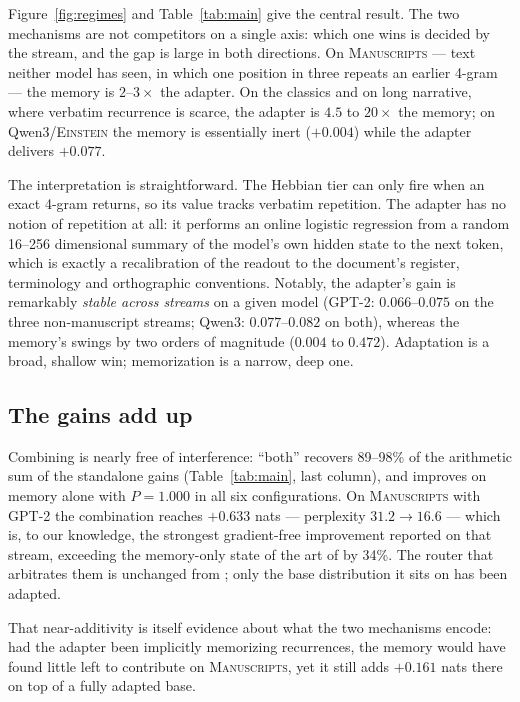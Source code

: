 \documentclass[11pt]{article}
\begin{document}
Figure~\ref{fig:regimes} and Table~\ref{tab:main} give the central result. The two mechanisms are not competitors on a single axis: which one wins is decided by the stream, and the gap is large in both directions. On \textsc{Manuscripts} --- text neither model has seen, in which one position in three repeats an earlier 4-gram --- the memory is $2$--$3\times$ the adapter. On the classics and on long narrative, where verbatim recurrence is scarce, the adapter is $4.5$ to $20\times$ the memory; on Qwen3/\textsc{Einstein} the memory is essentially inert ($+0.004$) while the adapter delivers $+0.077$.

The interpretation is straightforward. The Hebbian tier can only fire when an exact 4-gram returns, so its value tracks verbatim repetition. The adapter has no notion of repetition at all: it performs an online logistic regression from a random 16--256 dimensional summary of the model's own hidden state to the next token, which is exactly a recalibration of the readout to the document's register, terminology and orthographic conventions. Notably, the adapter's gain is remarkably \emph{stable across streams} on a given model (GPT-2: $0.066$--$0.075$ on the three non-manuscript streams; Qwen3: $0.077$--$0.082$ on both), whereas the memory's swings by two orders of magnitude ($0.004$ to $0.472$). Adaptation is a broad, shallow win; memorization is a narrow, deep one.

\subsection{The gains add up}\label{sec:additivity}

Combining is nearly free of interference: ``both'' recovers 89--98\% of the arithmetic sum of the standalone gains (Table~\ref{tab:main}, last column), and improves on memory alone with $P = 1.000$ in all six configurations. On \textsc{Manuscripts} with GPT-2 the combination reaches $+0.633$ nats --- perplexity $31.2 \to 16.6$ --- which is, to our knowledge, the strongest gradient-free improvement reported on that stream, exceeding the memory-only state of the art of \cite{sillage,router} by 34\%. The router that arbitrates them is unchanged from \cite{router}; only the base distribution it sits on has been adapted.

That near-additivity is itself evidence about what the two mechanisms encode: had the adapter been implicitly memorizing recurrences, the memory would have found little left to contribute on \textsc{Manuscripts}, yet it still adds $+0.161$ nats there on top of a fully adapted base.
\end{document}
